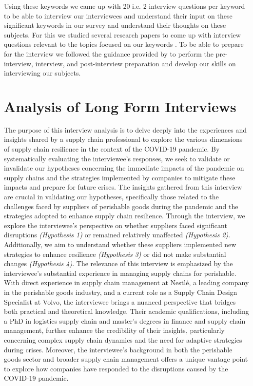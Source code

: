 Using these keywords we came up with 20 i.e. 2 interview questions per keyword to be able to interview our interviewees and understand their input on these significant keywords in our survey and understand their thoughts on these subjects. For this we studied several research papers to come up with interview questions relevant to the topics focused on our keywords \parencite{Tukamuhabwa2015SupplyStudy,Ponomarov2009UnderstandingResilience,Wu2007MethodologyAnalysis,Sawik2017AManagement,Chowdhury2021COVID-19Review}. To be able to prepare for the interview we followed the guidance provided by \textcite{Ghauri2020ResearchStudies} to perform the pre-interview, interview, and post-interview preparation and develop our skills on interviewing our subjects.

\section{Analysis of Long Form Interviews}

The purpose of this interview analysis is to delve deeply into the experiences and insights shared by a supply chain professional to explore the various dimensions of supply chain resilience in the context of the COVID-19 pandemic. By systematically evaluating the interviewee's responses, we seek to validate or invalidate our hypotheses concerning the immediate impacts of the pandemic on supply chains and the strategies implemented by companies to mitigate these impacts and prepare for future crises. The insights gathered from this interview are crucial in validating our hypotheses, specifically those related to the challenges faced by suppliers of perishable goods during the pandemic and the strategies adopted to enhance supply chain resilience. Through the interview, we explore the interviewee's perspective on whether suppliers faced significant disruptions \textit{(Hypothesis 1)} or remained relatively unaffected \textit{(Hypothesis 2)}. Additionally, we aim to understand whether these suppliers implemented new strategies to enhance resilience \textit{(Hypothesis 3)} or did not make substantial changes \textit{(Hypothesis 4)}. The relevance of this interview is emphasized by the interviewee's substantial experience in managing supply chains for perishable. With direct experience in supply chain management at Nestlé, a leading company in the perishable goods industry, and a current role as a Supply Chain Design Specialist at Volvo, the interviewee brings a nuanced perspective that bridges both practical and theoretical knowledge. Their academic qualifications, including a PhD in logistics supply chain and master’s degrees in finance and supply chain management, further enhance the credibility of their insights, particularly concerning complex supply chain dynamics and the need for adaptive strategies during crises. Moreover, the interviewee's background in both the perishable goods sector and broader supply chain management offers a unique vantage point to explore how companies have responded to the disruptions caused by the COVID-19 pandemic.

